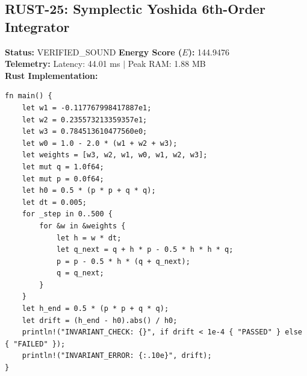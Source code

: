 \documentclass[11pt, a4paper]{article}
\begin{document}
\subsection{RUST-25: Symplectic Yoshida 6th-Order Integrator}
\textbf{Status:} VERIFIED\_SOUND \hfill \textbf{Energy Score ($E$):} 144.9476\\
\textbf{Telemetry:} Latency: 44.01 ms $|$ Peak RAM: 1.88 MB\\
\textbf{Rust Implementation:}
\begin{verbatim}
fn main() {
    let w1 = -0.117767998417887e1;
    let w2 = 0.235573213359357e1;
    let w3 = 0.784513610477560e0;
    let w0 = 1.0 - 2.0 * (w1 + w2 + w3);
    let weights = [w3, w2, w1, w0, w1, w2, w3];
    let mut q = 1.0f64;
    let mut p = 0.0f64;
    let h0 = 0.5 * (p * p + q * q);
    let dt = 0.005;
    for _step in 0..500 {
        for &w in &weights {
            let h = w * dt;
            let q_next = q + h * p - 0.5 * h * h * q;
            p = p - 0.5 * h * (q + q_next);
            q = q_next;
        }
    }
    let h_end = 0.5 * (p * p + q * q);
    let drift = (h_end - h0).abs() / h0;
    println!("INVARIANT_CHECK: {}", if drift < 1e-4 { "PASSED" } else { "FAILED" });
    println!("INVARIANT_ERROR: {:.10e}", drift);
}
\end{verbatim}
\end{document}
